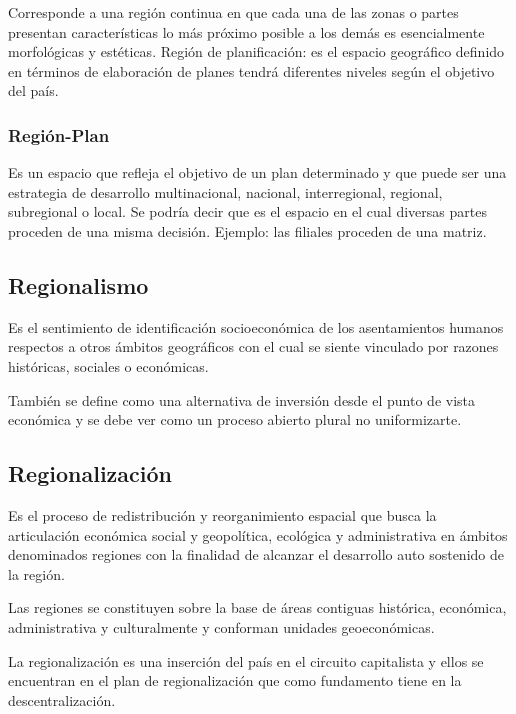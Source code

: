 \documentclass[
  jou,
  floatsintext,
  longtable,
  a4paper,
  nolmodern,
  notxfonts,
  notimes,
  12pt,
  colorlinks=true,linkcolor=blue,citecolor=blue,urlcolor=blue]{apa7}
\begin{document}
Corresponde a una región continua en que cada una de las zonas o partes
presentan características lo más próximo posible a los demás es
esencialmente morfológicas y estéticas. Región de planificación: es el
espacio geográfico definido en términos de elaboración de planes tendrá
diferentes niveles según el objetivo del país.

\subsubsection{Región-Plan}\label{regiuxf3n-plan}

Es un espacio que refleja el objetivo de un plan determinado y que puede
ser una estrategia de desarrollo multinacional, nacional, interregional,
regional, subregional o local. Se podría decir que es el espacio en el
cual diversas partes proceden de una misma decisión. Ejemplo: las
filiales proceden de una matriz.

\subsection{Regionalismo}\label{regionalismo}

Es el sentimiento de identificación socioeconómica de los asentamientos
humanos respectos a otros ámbitos geográficos con el cual se siente
vinculado por razones históricas, sociales o económicas.

También se define como una alternativa de inversión desde el punto de
vista económica y se debe ver como un proceso abierto plural no
uniformizarte.

\subsection{Regionalización}\label{regionalizaciuxf3n}

Es el proceso de redistribución y reorganimiento espacial que busca la
articulación económica social y geopolítica, ecológica y administrativa
en ámbitos denominados regiones con la finalidad de alcanzar el
desarrollo auto sostenido de la región.

Las regiones se constituyen sobre la base de áreas contiguas histórica,
económica, administrativa y culturalmente y conforman unidades
geoeconómicas.

La regionalización es una inserción del país en el circuito capitalista
y ellos se encuentran en el plan de regionalización que como fundamento
tiene en la descentralización.
\end{document}
